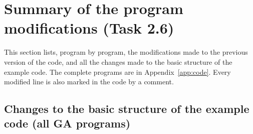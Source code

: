 \section{Summary of the program modifications (Task 2.6)}
\label{sec:codechanges}

This section lists, program by program, the modifications made to the previous version of the code, and
all the changes made to the basic structure of the example code. The complete programs are in
Appendix~\ref{app:code}. Every modified line is also marked in the code by a comment.

\subsection{Changes to the basic structure of the example code (all GA programs)}

